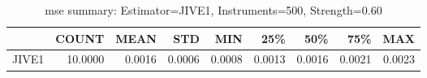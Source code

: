 \begin{table}[ht]
\centering
\caption{mse summary: Estimator=JIVE1, Instruments=500, Strength=0.60}
\begin{tabular}{lrrrrrrrr}
\toprule
 & COUNT & MEAN & STD & MIN & 25\% & 50\% & 75\% & MAX \\
\midrule
JIVE1 & 10.0000 & 0.0016 & 0.0006 & 0.0008 & 0.0013 & 0.0016 & 0.0021 & 0.0023 \\
\bottomrule
\end{tabular}
\end{table}
